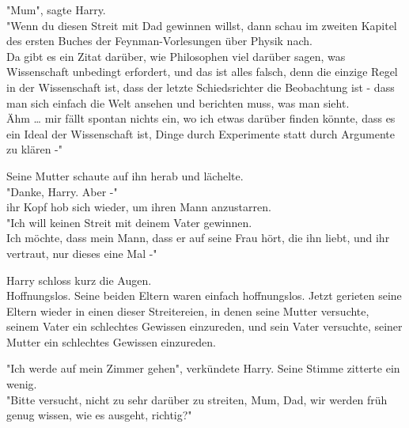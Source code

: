 {"Mum", sagte Harry.\\ "Wenn du diesen Streit mit Dad gewinnen willst, dann schau im zweiten Kapitel des ersten Buches der Feynman-Vorlesungen über Physik nach.\\ Da gibt es ein Zitat darüber, wie Philosophen viel darüber sagen, was Wissenschaft unbedingt erfordert, und das ist alles falsch, denn die einzige Regel in der Wissenschaft ist, dass der letzte Schiedsrichter die Beobachtung ist - dass man sich einfach die Welt ansehen und berichten muss, was man sieht.\\ Ähm … mir fällt spontan nichts ein, wo ich etwas darüber finden könnte, dass es ein Ideal der Wissenschaft ist, Dinge durch Experimente statt durch Argumente zu klären -"

Seine Mutter schaute auf ihn herab und lächelte.\\ "Danke, Harry. Aber -"\\ ihr Kopf hob sich wieder, um ihren Mann anzustarren.\\ "Ich will keinen Streit mit deinem Vater gewinnen.\\ Ich möchte, dass mein Mann, dass er auf seine Frau hört, die ihn liebt, und ihr vertraut, nur dieses eine Mal -"

Harry schloss kurz die Augen.\\ Hoffnungslos. Seine beiden Eltern waren einfach hoffnungslos. Jetzt gerieten seine Eltern wieder in einen dieser Streitereien, in denen seine Mutter versuchte, seinem Vater ein schlechtes Gewissen einzureden, und sein Vater versuchte, seiner Mutter ein schlechtes Gewissen einzureden.

"Ich werde auf mein Zimmer gehen", verkündete Harry. Seine Stimme zitterte ein wenig.\\ "Bitte versucht, nicht zu sehr darüber zu streiten, Mum, Dad, wir werden früh genug wissen, wie es ausgeht, richtig?"

}
